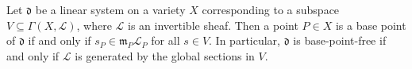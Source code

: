 Let $\mathfrak{d}$ be a linear system on a variety $X$ corresponding to a subspace $V \subseteq \Gamma(X, \mathcal{L})$, where $\mathcal{L}$ is an invertible sheaf. Then a point $P \in X$ is a base point of $\mathfrak{d}$ if and only if $s_P \in \mathfrak{m}_P \mathcal{L}_P$ for all $s \in V$. In particular, $\mathfrak{d}$ is base-point-free if and only if $\mathcal{L}$ is generated by the global sections in $V$.

